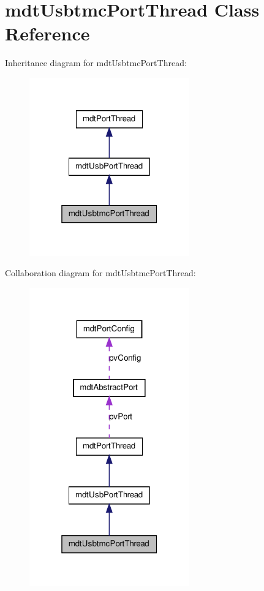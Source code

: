 \hypertarget{classmdt_usbtmc_port_thread}{
\section{mdtUsbtmcPortThread Class Reference}
\label{classmdt_usbtmc_port_thread}
}


Inheritance diagram for mdtUsbtmcPortThread:
\nopagebreak
\begin{figure}[H]
\begin{center}
\leavevmode
\includegraphics[width=196pt]{classmdt_usbtmc_port_thread__inherit__graph}
\end{center}
\end{figure}


Collaboration diagram for mdtUsbtmcPortThread:
\nopagebreak
\begin{figure}[H]
\begin{center}
\leavevmode
\includegraphics[width=196pt]{classmdt_usbtmc_port_thread__coll__graph}
\end{center}
\end{figure}
